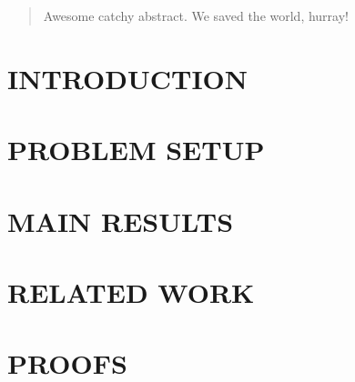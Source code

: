 \documentclass[twoside]{article}
\begin{document}
%

%



\begin{abstract}
	Awesome catchy abstract. We saved the world, hurray!
\end{abstract}

\section{INTRODUCTION}
\label{sec:intro}


\section{PROBLEM SETUP}
\label{sec:problem}


\section{MAIN RESULTS}
\label{sec:results}


\section{RELATED WORK}
\label{sec:related}


\section{PROOFS}
\label{sec:proofs}

\end{document}
